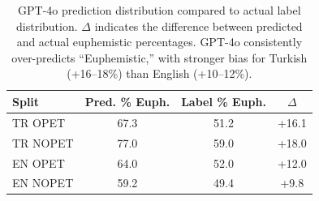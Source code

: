 
\begin{table}[h]
\centering
\small
\begin{tabular}{lccc}
\toprule
\textbf{Split} & \textbf{Pred. \% Euph.} & \textbf{Label \% Euph.} & \textbf{$\Delta$} \\
\midrule
TR OPET  & 67.3 & 51.2 & +16.1 \\
TR NOPET & 77.0 & 59.0 & +18.0 \\
EN OPET  & 64.0 & 52.0 & +12.0 \\
EN NOPET & 59.2 & 49.4 & +9.8 \\
\bottomrule
\end{tabular}
\caption{GPT-4o prediction distribution compared to actual label distribution. $\Delta$ indicates the difference between predicted and actual euphemistic percentages. GPT-4o consistently over-predicts ``Euphemistic,'' with stronger bias for Turkish (+16--18\%) than English (+10--12\%).}
\label{tab:gpt4o_bias}
\end{table}

% 
